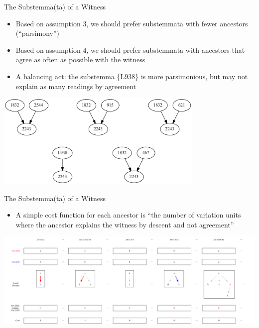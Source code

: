 \documentclass[10pt]{beamer}
\begin{document}
	\begin{frame}{The Substemma(ta) of a Witness}
		\begin{itemize}
			\item Based on assumption 3, we should prefer substemmata with fewer ancestors (``parsimony'')
			\item Based on assumption 4, we should prefer substemmata with ancestors that agree as often as possible with the witness
			\item A balancing act: the substemma \{L938\} is more parsimonious, but may not explain as many readings by agreement
		\end{itemize}
		\begin{center}
			\includegraphics[width=0.75\textwidth]{../img/substemmata.pdf}
		\end{center}
	\end{frame}
	\begin{frame}{The Substemma(ta) of a Witness}
		\begin{itemize}
			\item A simple cost function for each ancestor is ``the number of variation units where the ancestor explains the witness by descent and not agreement''
		\end{itemize}
		\begin{center}
			\includegraphics[width=\textwidth]{../img/explained-readings-costs.pdf}
		\end{center}
	\end{frame}
\end{document}

